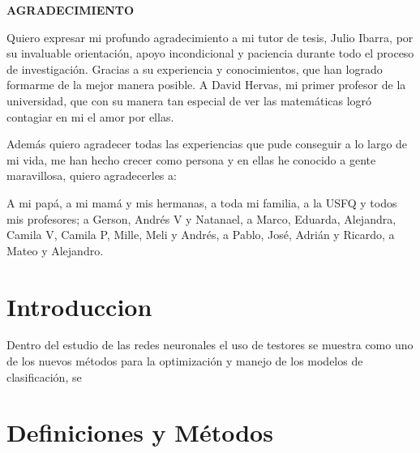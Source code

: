 \documentclass[a4paper, 12pt]{report}
\begin{document}
\newpage
\begin{center}
  \textbf{AGRADECIMIENTO}
\end{center}
Quiero expresar mi profundo agradecimiento a mi tutor de tesis,
Julio Ibarra, por su invaluable orientación, apoyo incondicional y
paciencia durante todo el proceso de investigación. Gracias a su experiencia y
conocimientos, que han logrado formarme de la mejor manera posible. 
A David Hervas, mi primer profesor de la universidad, que
con su manera tan especial de ver las matemáticas logró contagiar en mi el amor
por ellas.

Además quiero agradecer todas las experiencias que pude conseguir a lo
largo de mi vida, me han hecho crecer como persona y en ellas he conocido a
gente maravillosa, quiero agradecerles a:

A mi papá, a mi mamá y mis hermanas, a toda mi familia, a la USFQ y todos mis
profesores; a Gerson, Andrés V y Natanael, a Marco, Eduarda, Alejandra, Camila V,
Camila P, Mille, Meli y Andrés, a Pablo, José, Adrián y Ricardo, a Mateo y
Alejandro.

 

\clearpage

\chapter{Introduccion}\label{cap.introduccion}
Dentro del estudio de las redes neuronales el uso de testores se muestra como
uno de los nuevos métodos para la optimización y manejo de los modelos de
clasificación, se

\cite{testor}

\chapter{Definiciones y Métodos}\label{cap.testores}




 
\end{document}
